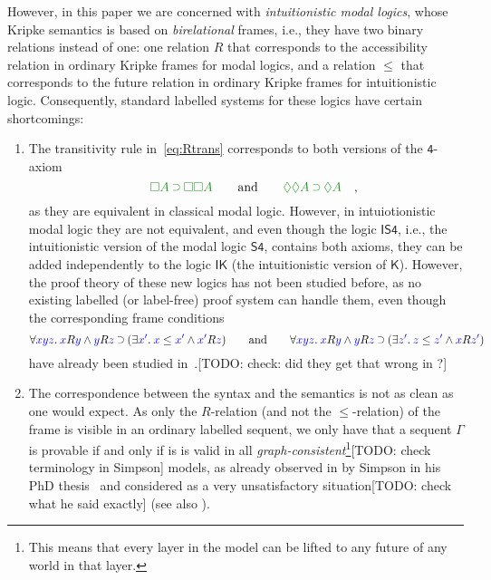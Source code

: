 \documentclass[a4paper]{article}
\theoremstyle{plain}
\theoremstyle{definition}
\newcommand{\todo}[1]{{\color{red}[TODO: #1]}}
\newcommand*{\IK}{\mathsf{IK}}
\newcommand*{\K}{\mathsf{K}}
\newcommand*{\ISfour}{\mathsf{IS4}}
\newcommand*{\Sfour}{\mathsf{S4}}
\newcommand{\fourax}{\mathsf{4}}
\newcommand*{\AND}{\mathbin{\wedge}}
\newcommand*{\IMP}{\mathbin{\scalebox{.9}{\raise.2ex\hbox{$\supset$}}}}
\newcommand*{\BOX}{\mathord{\Box}}
\newcommand*{\DIA}{\mathord{\Diamond}}
\newcommand*{\fm}[1]{{\color{notgreen}{#1}}}
\newcommand*{\lb}[1]{{\color{blue}{#1}}}
\newcommand*{\accs}[2]{\lb{#1}R\lb{#2}}
\newcommand*{\futs}[2]{\lb{#1}\le{\color{blue}{#2}}}
\newcommand{\qquand}{\qquad\mbox{and}\qquad}
\newcommand{\quadcm}{\rlap{\quad,}}
\begin{document}
However,
in this paper we are concerned with \emph{intuitionistic modal
  logics}, whose Kripke semantics is based on \emph{birelational}
frames, i.e., they have two binary relations instead of one: one
relation $R$ that corresponds to the accessibility relation in
ordinary Kripke frames for modal logics, and a relation $\le$ that
corresponds to the future relation in ordinary Kripke frames for
intuitionistic logic. Consequently, standard labelled systems for
these logics have certain shortcomings:
\begin{enumerate}
\item The transitivity rule in~\eqref{eq:Rtrans} corresponds to both
  versions of the $\fourax$-axiom
  \begin{equation}
    \label{eq:4ax}
    \fm{\BOX A\IMP \BOX\BOX A}
    \qquand
    \fm{\DIA\DIA A\IMP\DIA A}
    \quadcm
  \end{equation}
  as they are equivalent in classical
  modal logic. However, in intuiotionistic modal logic they are not
  equivalent, and even though the logic $\ISfour$, i.e., the
  intuitionistic version of the modal logic $\Sfour$, contains both
  axioms, they can be added independently to the logic $\IK$ (the
  intuitionistic version of $\K$). However, the proof theory of these
  new logics has not been studied before, as no existing labelled (or
  label-free) proof system can handle them, even though the
  corresponding frame conditions
  \begin{equation}
    \label{eq:4frame}
    \forall\lb{xyz}.\:\accs xy\AND \accs yz\IMP(\exists\lb{x'}.\:\futs x{x'}\AND\accs {x'}z)
    \qquand
    \forall\lb{xyz}.\:\accs xy\AND \accs yz\IMP(\exists\lb{z'}.\:\futs z{z'}\AND\accs {x}{z'})
  \end{equation}
  have already been studied
  in~\cite{plotkin:stirling:86}.\todo{check: did they get that wrong in  \cite{plotkin:stirling:86}?}
\item The correspondence between the syntax and the semantics is not
  as clean as one would expect. As only the $R$-relation (and not the
  $\le$-relation) of the frame is visible in an ordinary labelled
  sequent, we only have that a sequent $\Gamma$ is provable if and
  only if is is valid in all \emph{graph-consistent}\footnote{This
    means that every layer in the model can be lifted to any future of
    any world in that layer.}\todo{check terminology in Simpson} models, as
  already observed in by Simpson in his PhD thesis~\cite{simpson:phd}
  and considered as a very unsatisfactory situation\todo{check what he
    said exactly} (see also \cite{mar:str:tableaux17}).
\end{enumerate}
\end{document}
